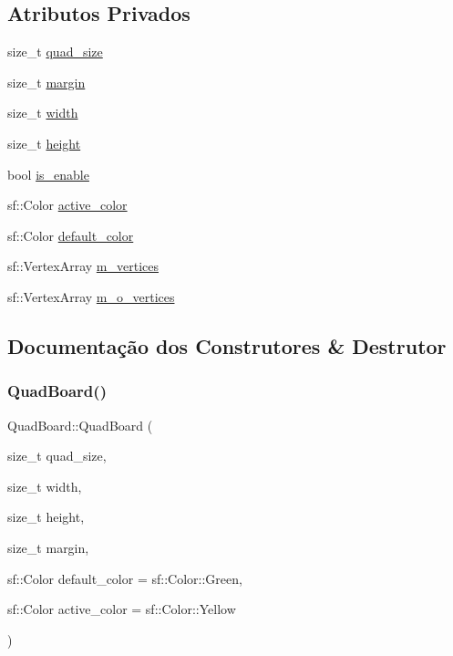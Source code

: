 \subsection*{Atributos Privados}
\begin{DoxyCompactItemize}
\item 
size\+\_\+t \hyperlink{classQuadBoard_ad07dae11e342f91f28b562441392523b}{quad\+\_\+size}
\item 
size\+\_\+t \hyperlink{classQuadBoard_a16bb409d20f76da6821f061792e87cae}{margin}
\item 
size\+\_\+t \hyperlink{classQuadBoard_a2e816c0a22fdaaf5efe57d4f05927f15}{width}
\item 
size\+\_\+t \hyperlink{classQuadBoard_a6db254c6e18450c8360ae6e7812a45c1}{height}
\item 
bool \hyperlink{classQuadBoard_acec3b891c0bb3744ed92e3c53ad95e17}{is\+\_\+enable}
\item 
sf\+::\+Color \hyperlink{classQuadBoard_ad89b47afa74de80a44b9c4b71636203a}{active\+\_\+color}
\item 
sf\+::\+Color \hyperlink{classQuadBoard_accb4dd5701108279703e9835cb777e8c}{default\+\_\+color}
\item 
sf\+::\+Vertex\+Array \hyperlink{classQuadBoard_af97c7c0427f288301f6c6a5a8f6059d3}{m\+\_\+vertices}
\item 
sf\+::\+Vertex\+Array \hyperlink{classQuadBoard_a40e514c6731698f7914a8ae02f89e61f}{m\+\_\+o\+\_\+vertices}
\end{DoxyCompactItemize}


\subsection{Documentação dos Construtores \& Destrutor}
\mbox{\label{classQuadBoard_aaf660c18a1bf1e41ba592a57ff26b69b}} 
\subsubsection{\texorpdfstring{Quad\+Board()}{QuadBoard()}}
{\footnotesize\ttfamily Quad\+Board\+::\+Quad\+Board (\begin{DoxyParamCaption}\item[{size\+\_\+t}]{quad\+\_\+size,  }\item[{size\+\_\+t}]{width,  }\item[{size\+\_\+t}]{height,  }\item[{size\+\_\+t}]{margin,  }\item[{sf\+::\+Color}]{default\+\_\+color = {\ttfamily sf\+:\+:Color\+:\+:Green},  }\item[{sf\+::\+Color}]{active\+\_\+color = {\ttfamily sf\+:\+:Color\+:\+:Yellow} }\end{DoxyParamCaption})}

